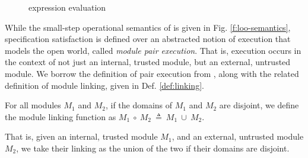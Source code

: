 \begin{figure}[t]
\begin{minipage}{\textwidth}
\begin{minipage}{\textwidth}
\caption{\Loo expression evaluation}
\label{f:evaluation}
\end{minipage}
\end{minipage}
\end{figure}

While the small-step operational semantics of \Loo is given in Fig. \ref{f:loo-semantics},
specification satisfaction is defined over an abstracted notion of 
execution that models the open world, called \emph{module pair execution}. 
That is, execution occurs in the context of not just an internal, trusted module, but 
an external, untrusted module. We borrow the definition of pair execution 
from \citeauthor{FASE}, along with the related definition of module linking, given in Def. \ref{def:linking}.
\begin{definition}
\label{def:linking}
For all modules $M_1$ and $M_2$, if the domains of $M_1$ and $M_2$ are disjoint, 
we define the module linking function as $M_1\ \circ\ M_2\ \triangleq\ M_1\ \cup\ M_2$.
\end{definition}
That is, given an internal, trusted module $M_1$, and an external, untrusted module $M_2$, 
we take their linking as the union of the two if their domains are disjoint.

